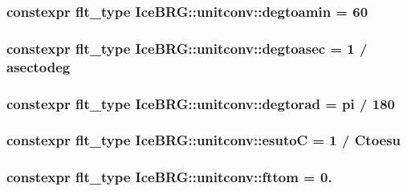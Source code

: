 \subsubsection[{degtoamin}]{\setlength{\rightskip}{0pt plus 5cm}constexpr {\bf flt\+\_\+type} Ice\+B\+R\+G\+::unitconv\+::degtoamin = 60}\label{namespaceIceBRG_1_1unitconv_a21a6bd7ae8d55348c171762f6f9603cd}
\hypertarget{namespaceIceBRG_1_1unitconv_aa01c554ed0e793f74acd672444aeb31b}{}
\subsubsection[{degtoasec}]{\setlength{\rightskip}{0pt plus 5cm}constexpr {\bf flt\+\_\+type} Ice\+B\+R\+G\+::unitconv\+::degtoasec = 1 / {\bf asectodeg}}\label{namespaceIceBRG_1_1unitconv_aa01c554ed0e793f74acd672444aeb31b}
\hypertarget{namespaceIceBRG_1_1unitconv_a4c6ac59ab3c4791eb00efcc673a392d3}{}
\subsubsection[{degtorad}]{\setlength{\rightskip}{0pt plus 5cm}constexpr {\bf flt\+\_\+type} Ice\+B\+R\+G\+::unitconv\+::degtorad = {\bf pi} / 180}\label{namespaceIceBRG_1_1unitconv_a4c6ac59ab3c4791eb00efcc673a392d3}
\hypertarget{namespaceIceBRG_1_1unitconv_aecc45391d888e1a1b87d1bfe36739b9a}{}
\subsubsection[{esuto\+C}]{\setlength{\rightskip}{0pt plus 5cm}constexpr {\bf flt\+\_\+type} Ice\+B\+R\+G\+::unitconv\+::esuto\+C = 1 / {\bf Ctoesu}}\label{namespaceIceBRG_1_1unitconv_aecc45391d888e1a1b87d1bfe36739b9a}
\hypertarget{namespaceIceBRG_1_1unitconv_abdcf8c1ce157eb8bb8c092dfaa86ab4e}{}
\subsubsection[{fttom}]{\setlength{\rightskip}{0pt plus 5cm}constexpr {\bf flt\+\_\+type} Ice\+B\+R\+G\+::unitconv\+::fttom = 0.}\label{namespaceIceBRG_1_1unitconv_abdcf8c1ce157eb8bb8c092dfaa86ab4e}
\hypertarget{namespaceIceBRG_1_1unitconv_ab9b925d541a5302d95841d5fd7971133}{}
